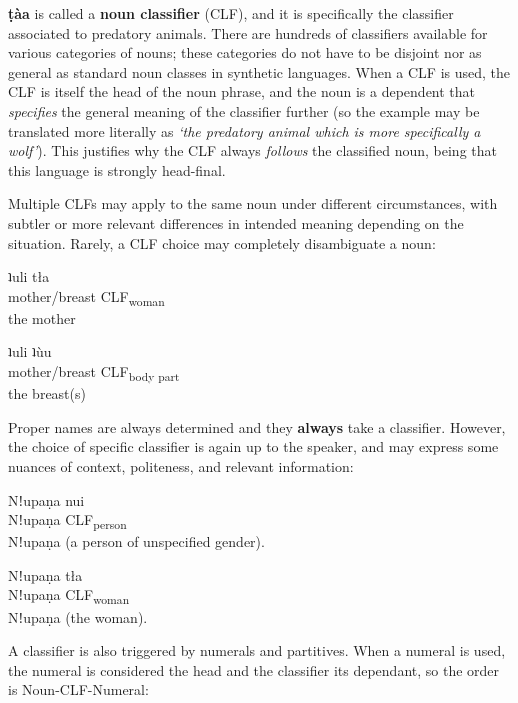 \documentclass[11pt]{book}
\newcommand{\qcn}[1]{\textbf{#1}}
\newcommand{\grammsc}[1]{\textsc{#1}}
\newcommand{\CLF}[1]{\grammsc{CLF}\textsubscript{#1}}
\begin{document}
\qcn{ṭàa} is called a \textbf{noun classifier} (CLF), and it is specifically the classifier associated to predatory animals. There are hundreds of classifiers available for various categories of nouns; these categories do not have to be disjoint nor as general as standard noun classes in synthetic languages. When a CLF is used, the CLF is itself the head of the noun phrase, and the noun is a dependent that \emph{specifies} the general meaning of the classifier further (so the example may be translated more literally as \emph{`the predatory animal which is more specifically a wolf'}). This justifies why the CLF always \emph{follows} the classified noun, being that this language is strongly head-final.

Multiple CLFs may apply to the same noun under different circumstances, with subtler or more relevant differences in intended meaning depending on the situation. Rarely, a CLF choice may completely disambiguate a noun:

\begin{exe}
\ex
\gll ʇuli tła\\
mother/breast \CLF{woman}\\
\glt the mother
\end{exe}

\begin{exe}
\ex
\gll ʇuli ʇùu\\
mother/breast \CLF{body part}\\
\glt the breast(s)
\end{exe}

Proper names are always determined and they \textbf{always} take a classifier. However, the choice of specific classifier is again up to the speaker, and may express some nuances of context, politeness, and relevant information:

\begin{exe}
\ex
\gll Nǃupaṇa nui\\
Nǃupaṇa 	\CLF{person}\\
\glt Nǃupaṇa (a person of unspecified gender).
\end{exe}

\begin{exe}
\ex
\gll Nǃupaṇa 	tła\\
Nǃupaṇa 	\CLF{woman}\\
\glt Nǃupaṇa (the woman).
\end{exe}

A classifier is also triggered by numerals and partitives. When a numeral is used, the numeral is considered the head and the classifier its dependant, so the order is Noun-CLF-Numeral:
\end{document}
